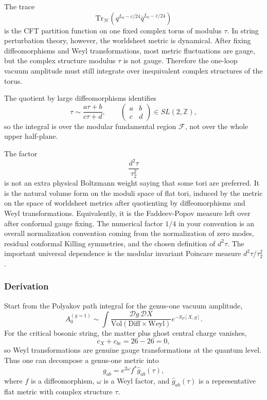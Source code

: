 \documentclass[
  10pt,
  a4paper,
  openany]{book}
\begin{document}
The trace \[
\mathrm{Tr}_{\mathcal H}\left(q^{L_0-c/24}\bar q^{\bar L_0-\bar c/24}\right)
\] is the CFT partition function on one fixed complex torus of modulus
\(\tau\). In string perturbation theory, however, the worldsheet metric
is dynamical. After fixing diffeomorphisms and Weyl transformations,
most metric fluctuations are gauge, but the complex structure modulus
\(\tau\) is not gauge. Therefore the one-loop vacuum amplitude must
still integrate over inequivalent complex structures of the torus.

The quotient by large diffeomorphisms identifies \[
\tau \sim \frac{a\tau+b}{c\tau+d},
\qquad
\begin{pmatrix}
a & b\\
c & d
\end{pmatrix}
\in SL(2,\mathbb Z),
\] so the integral is over the modular fundamental region
\(\mathcal F\), not over the whole upper half-plane.

The factor \[
\frac{d^2\tau}{\tau_2^2}
\] is not an extra physical Boltzmann weight saying that some tori are
preferred. It is the natural volume form on the moduli space of flat
tori, induced by the metric on the space of worldsheet metrics after
quotienting by diffeomorphisms and Weyl transformations. Equivalently,
it is the Faddeev-Popov measure left over after conformal gauge fixing.
The numerical factor \(1/4\) in your convention is an overall
normalization convention coming from the normalization of zero modes,
residual conformal Killing symmetries, and the chosen definition of
\(d^2\tau\). The important universal dependence is the modular invariant
Poincare measure \(d^2\tau/\tau_2^2\).

\subsubsection{Derivation}\label{derivation}

Start from the Polyakov path integral for the genus-one vacuum
amplitude, \[
A_0^{(g=1)}
\sim
\int \frac{\mathcal D g\,\mathcal D X}{\mathrm{Vol}(\mathrm{Diff}\times \mathrm{Weyl})}
e^{-S_P[X,g]}.
\] For the critical bosonic string, the matter plus ghost central charge
vanishes, \[
c_X+c_{bc}=26-26=0,
\] so Weyl transformations are genuine gauge transformations at the
quantum level. Thus one can decompose a genus-one metric into \[
g_{ab}
=
e^{2\omega}
f^*\hat g_{ab}(\tau),
\] where \(f\) is a diffeomorphism, \(\omega\) is a Weyl factor, and
\(\hat g_{ab}(\tau)\) is a representative flat metric with complex
structure \(\tau\).
\end{document}
